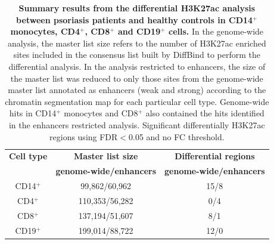 \begin{table}[htbp]
\centering
\begin{tabular}{@{} c c c}
\toprule
\textbf{Cell type}   & \textbf{Master list size}      & \textbf{Differential regions}      \\
                     & \textbf{genome-wide/enhancers} & \textbf{genome-wide/enhancers}     \\
\midrule
\midrule
CD14$^+$             & 99,862/60,962                  & 15/8                                \\
CD4$^+$              & 110,353/56,282                 & 0/4																	\\
CD8$^+$              & 137,194/51,607                 & 8/1                                 \\ 
CD19$^+$             & 199,014/88,722                 & 12/0                                 \\
\bottomrule 
\end{tabular}
\medskip %
\caption[Summary results from the differential H3K27ac analysis between psoriasis patients and healthy controls in CD14$^+$ monocytes, CD4$^+$, CD8$^+$ and CD19$^+$ cells.]{\textbf{Summary results from the differential H3K27ac analysis between psoriasis patients and healthy controls in CD14$^+$ monocytes, CD4$^+$, CD8$^+$ and CD19$^+$ cells.} In the genome-wide analysis, the master list size refers to the number of H3K27ac enriched sites included in the consensus list built by DiffBind to perform the differential analysis. In the analysis restricted to enhancers, the size of the master list was reduced to only those sites from the genome-wide master list annotated as enhancers (weak and strong) according to the chromatin segmentation map for each particular cell type. Genome-wide hits in CD14$^+$ monocytes and CD8$^+$ also contained the hits identified in the enhancers restricted analysis. Significant differentially H3K27ac regions using FDR$<$0.05 and no FC threshold. }
\label{tab:ChIPm_differential_analysis_results}
\end{table}
\bigskip %


